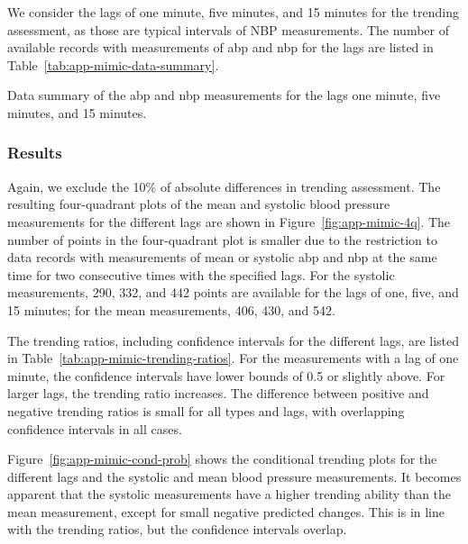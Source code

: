 We consider the lags of one minute, five minutes, and 15 minutes for the trending assessment, as those are typical intervals of NBP measurements.
The number of available records with measurements of \ac{abp} and \ac{nbp} for the lags are listed in Table~\ref{tab:app-mimic-data-summary}.

\begin{table}
    \centering
    \caption{Data summary of the \ac{abp} and \ac{nbp} measurements for the lags one minute, five minutes, and 15 minutes.}
    \label{tab:app-mimic-data-summary}
\end{table}

\subsubsection*{Results}

Again, we exclude the 10\% of absolute differences in trending assessment.
The resulting four-quadrant plots of the mean and systolic blood pressure measurements for the different lags are shown in Figure~\ref{fig:app-mimic-4q}.
The number of points in the four-quadrant plot is smaller due to the restriction to data records with measurements of mean or systolic \ac{abp} and \ac{nbp} at the same time for two consecutive times with the specified lags.
For the systolic measurements, 290, 332, and 442 points are available for the lags of one, five, and 15 minutes; for the mean measurements, 406, 430, and 542.

The trending ratios, including confidence intervals for the different lags, are listed in Table~\ref{tab:app-mimic-trending-ratios}.
For the measurements with a lag of one minute, the confidence intervals have lower bounds of 0.5 or slightly above.
For larger lags, the trending ratio increases.
The difference between positive and negative trending ratios is small for all types and lags, with overlapping confidence intervals in all cases.

Figure~\ref{fig:app-mimic-cond-prob} shows the conditional trending plots for the different lags and the systolic and mean blood pressure measurements.
It becomes apparent that the systolic measurements have a higher trending ability than the mean measurement, except for small negative predicted changes.
This is in line with the trending ratios, but the confidence intervals overlap.

